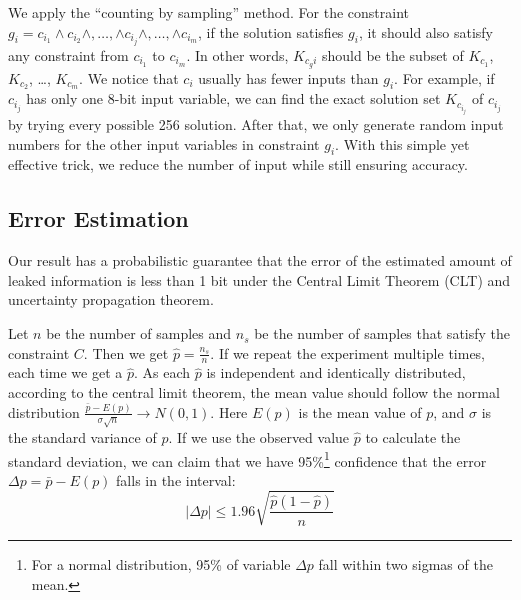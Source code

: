 We apply the ``counting by sampling'' method. For
the constraint $g_{i}= c_{i_1} \land c_{i_2} \land ,\ldots, \land c_{i_j} \land
,\ldots, \land c_{i_m}$, if the solution satisfies $g_{i}$, it should also
satisfy any constraint from $c_{i_1}$ to $c_{i_m}$. In other words, $K_{c_gi}$
should be the subset of $K_{c_1}$, $K_{c_2}$, \ldots , $K_{c_m}$. We notice that
$c_i$ usually has fewer inputs than $g_{i}$. For example, if
$c_{i_j}$ has only one 8-bit input variable, we can find the exact solution set
$K_{c_{i_j}}$ of $c_{i_j}$ by trying every possible 256 solution. After that,
we only generate random input numbers for the other input variables in
constraint $g_{i}$. With this simple yet effective trick, we reduce the number of input
while still ensuring accuracy.




\subsection{Error Estimation}
\label{sssec:errest}
Our result has a probabilistic guarantee that the error of the estimated amount of leaked 
information is less than 1 bit under the Central Limit Theorem (CLT) and uncertainty
propagation theorem.

Let $n$ be the number of samples and $n_s$ be the number of samples that satisfy
the constraint $C$. Then we get $\hat{p} = \frac{n_s}{n}$. If we repeat the
experiment multiple times, each time we get a $\hat{p}$. As each
$\hat{p}$ is independent and identically distributed, according to the central limit
theorem, the mean value should follow the normal distribution
$ \frac{\bar{p}-E(p)}{\sigma\sqrt{n}} \rightarrow N(0,1) $. Here $E(p)$ is the
mean value of $p$, and $\sigma$ is the standard variance of $p$. If we use the
observed value $\hat{p}$ to calculate the standard deviation, we can claim that
we have 95\%\footnote{For a normal distribution, 95\% of variable $\Delta p$ fall within two sigmas of the mean.} 
confidence that the error $\Delta p= \bar{p} - E(p)$ falls in the interval:
$$ |\Delta p| \leq 1.96\sqrt{\frac{ \hat{p} (1- \hat{p} )}{n}}$$

